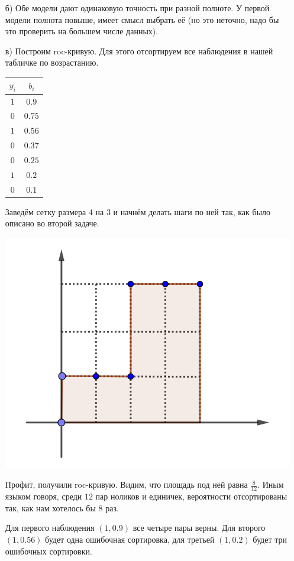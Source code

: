 \documentclass[12pt, a4paper, oneside]{article}
\begin{document}
{\begin{enumerate}
		\item[б)]  Обе модели дают одинаковую точность при разной полноте. У первой модели полнота повыше, имеет смысл выбрать её (но это неточно, надо бы это проверить на большем числе данных). 
		
		\item[в)] Построим roc-кривую. Для этого отсортируем все наблюдения в нашей табличке по возрастанию.
		
		\begin{center}
			\begin{tabular}{c|c}
				$y_i$ & $b_i$ \\
				\hline
				$1$  & $0.9$ \\
				$0$ & $0.75$ \\
				$1$ & $0.56$ \\
				$0$ & $0.37$ \\	
				$0$ & $0.25$ \\			
				$1$ & $0.2$ \\												
				$0$ & $0.1$ \\
			\end{tabular}
		\end{center}
		
		Заведём сетку размера 4 на 3 и начнём делать шаги по ней так, как было описано во второй задаче.
		
		\begin{center}
			\includegraphics[width=.4\paperwidth]{roc_auc2.png}
		\end{center}
		
		Профит, получили roc-кривую.  Видим, что площадь под ней равна $\frac{8}{12}$. Иным языком говоря, среди $12$ пар ноликов и единичек, вероятности отсортированы так, как нам хотелось бы $8$ раз. 
		
		Для первого наблюдения $(1, 0.9)$ все четыре пары верны. Для второго $(1, 0.56)$ будет одна ошибочная сортировка, для третьей $(1,0.2)$ будет три ошибочных сортировки. 
	\end{enumerate}
	
}
\end{document}
